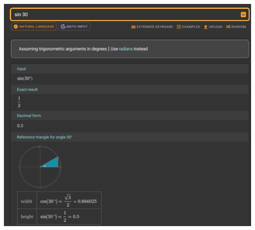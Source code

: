 \documentclass[a4paper, oneside, 11pt]{report}
\begin{document}
	\includegraphics[width = 160mm]{Screenshot 2025-01-03 162013.png} \\

	\label{app:other}
\end{document}
